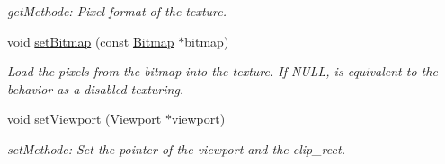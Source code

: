 \begin{DoxyCompactItemize}
\begin{DoxyCompactList}\small\item\em getMethode: Pixel format of the texture. \item\end{DoxyCompactList}\item 
void \hyperlink{class_f2_c_1_1_array_sprite_af4812f3e122823e29d8d6f82d64799ac}{setBitmap} (const \hyperlink{class_f2_c_1_1_bitmap}{Bitmap} $\ast$bitmap)
\begin{DoxyCompactList}\small\item\em Load the pixels from the bitmap into the texture. If NULL, is equivalent to the behavior as a disabled texturing. \item\end{DoxyCompactList}\item 
void \hyperlink{class_f2_c_1_1_array_sprite_a960ba03bf1797621f00aaad269776dd2}{setViewport} (\hyperlink{class_f2_c_1_1_viewport}{Viewport} $\ast$\hyperlink{class_f2_c_1_1_array_sprite_acbf1252a3782ba0a09c14b0b52fd48b8}{viewport})
\begin{DoxyCompactList}\small\item\em setMethode: Set the pointer of the viewport and the clip\_\-rect. \item\end{DoxyCompactList}\end{DoxyCompactItemize}
